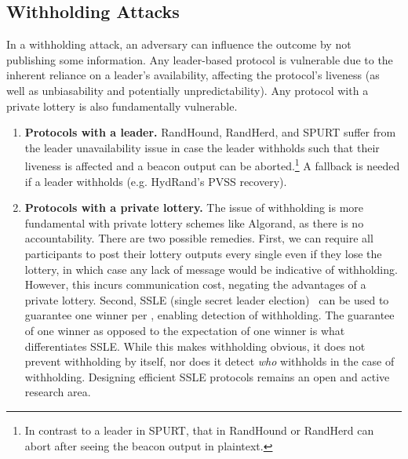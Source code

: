 \subsection{Withholding Attacks}
\label{subsection:withholding}
In a withholding attack, an adversary can influence the outcome by not publishing some information. Any leader-based protocol is vulnerable due to the inherent reliance on a leader's availability, affecting the protocol's liveness (as well as unbiasability and potentially unpredictability). Any protocol with a private lottery is also fundamentally vulnerable.
\begin{enumerate}
\item \textbf{Protocols with a leader.} RandHound, RandHerd, and SPURT suffer from the leader unavailability issue in case the leader withholds such that their liveness is affected and a beacon output can be aborted.\footnote{In contrast to a leader in SPURT, that in RandHound or RandHerd can abort after seeing the beacon output in plaintext.}
A fallback is needed if a leader withholds (e.g. HydRand's PVSS recovery).
\item \textbf{Protocols with a private lottery.} The issue of withholding is more fundamental with private lottery schemes like Algorand, as there is no accountability. There are two possible remedies. First, we can require all participants to post their lottery outputs every single \epoch even if they lose the lottery, in which case any lack of message would be indicative of withholding. However, this incurs communication cost, negating the advantages of a private lottery. Second, SSLE (single secret leader election)~\cite{boneh2020single} can be used to guarantee one winner per \epoch, enabling detection of withholding.
The guarantee of one winner as opposed to the expectation of one winner is what differentiates SSLE. While this makes withholding obvious, it does not prevent withholding by itself, nor does it detect \emph{who} withholds in the case of withholding.
Designing efficient SSLE protocols remains an open and active research area.
\end{enumerate}

